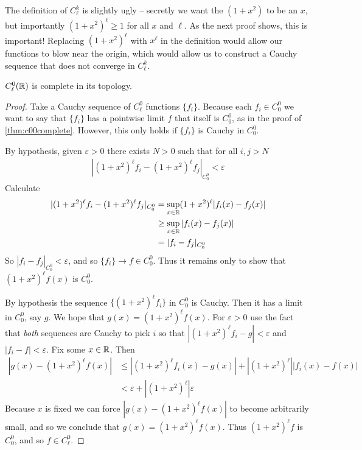       The definition of $C^k_\ell$ is slightly ugly -- secretly we want the $(1+x^2)$ to be an $x$, but importantly $(1+x^2)^\ell\ge1$ for all $x$ and $\ell$.
      As the next proof shows, this is important!
      Replacing $(1+x^2)^\ell$ with $x^\ell$ in the definition would allow our functions to blow near the origin, which would allow us to construct a Cauchy sequence that does not converge in $C^k_\ell$.
      \begin{thm}
        \label{thm:c0lcomplete}
        $C^0_\ell(\mathbb{R})$ is complete in its topology.
      \end{thm}
      \begin{proof}
        Take a Cauchy sequence of $C^0_\ell$ functions $\{f_i\}$.
        Because each $f_i\in C^0_0$ we want to say that $\{f_i\}$ has a pointwise limit $f$ that itself is $C^0_0$, as in the proof of \cref{thm:c00complete}.
        However, this only holds if $\{f_i\}$ is Cauchy in $C^0_0$. 

        By hypothesis, given $\varepsilon>0$ there exists $N>0$ such that for all $i,j>N$
        \begin{align*}
          |(1+x^2)^\ell f_i - (1+x^2)^\ell f_j|_{C^0_0} < \varepsilon
        \end{align*}
        Calculate 
        \begin{align*}
          |(1+x^2)^\ell f_i - (1+x^2)^\ell f_j|_{C^0_0}
          &= \sup_{x\in\mathbb{R}}(1+x^2)^\ell|f_i(x)-f_j(x)|\\
          &\ge \sup_{x\in\mathbb{R}}|f_i(x)-f_j(x)|\\
          &= |f_i-f_j|_{C^0_0}
        \end{align*}
        So $|f_i-f_j|_{C^0_0}<\varepsilon$, and so $\{f_i\}\rightarrow f\in C^0_0$.
        Thus it remains only to show that $(1+x^2)^\ell f(x)$ is $C^0_0$.
        
        By hypothesis the sequence $\{(1+x^2)^\ell f_i\}$ in $C^0_0$ is Cauchy.
        Then it has a limit in $C^0_0$, say $g$.
        We hope that $g(x)=(1+x^2)^\ell f(x)$.
        For $\varepsilon>0$ use the fact that \emph{both} sequences are Cauchy to pick $i$ so that $|(1+x^2)^\ell f_i - g|<\varepsilon$ and $|f_i - f|<\varepsilon$.
        Fix some $x\in\mathbb{R}$.
        Then
        \begin{align*}
          |g(x) - (1+x^2)^\ell f(x)| &\le |(1+x^2)^\ell f_i(x) - g(x)|+|(1+x^2)^\ell||f_i(x)-f(x)|\\
          &< \varepsilon + |(1+x^2)^\ell|\varepsilon
        \end{align*}
        Because $x$ is fixed we can force $|g(x)-(1+x^2)^\ell f(x)|$ to become arbitrarily small, and so we conclude that $g(x)=(1+x^2)^\ell f(x)$.
        Thus $(1+x^2)^\ell f$ is $C^0_0$, and so $f\in C^0_\ell$.
      \end{proof}

